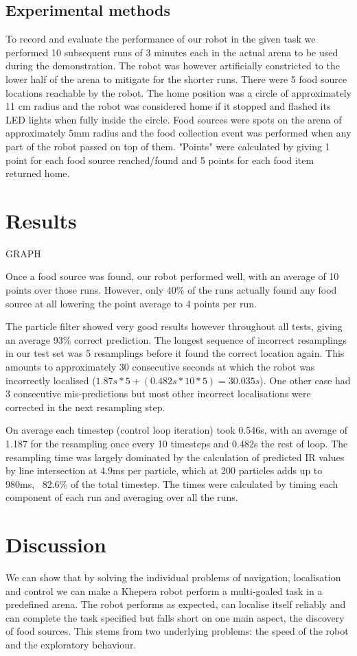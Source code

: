 \documentclass[paper=a4, fontsize=12pt]{scrartcl}	%
\numberwithin{equation}{section}		%
\numberwithin{figure}{section}			%
\numberwithin{table}{section}				%
\begin{document}
\subsection{Experimental methods}
To record and evaluate the performance of our robot in the given task we performed 10 subsequent runs of 3 minutes each in the actual arena to be used during the demonstration. The robot was however artificially constricted to the lower half of the arena to mitigate for the shorter runs. There were 5 food source locations reachable by the robot. The home position was a circle of approximately 11 cm radius and the robot was considered home if it stopped and flashed its LED lights when fully inside the circle. Food sources were spots on the arena of approximately 5mm radius and the food collection event was performed when any part of the robot passed on top of them. "Points" were calculated by giving 1 point for each food source reached/found and 5 points for each food item returned home.

\section{Results}
GRAPH

Once a food source was found, our robot performed well, with an average of 10 points over those runs. However, only 40\% of the runs actually found any food source at all lowering the point average to 4 points per run.

The particle filter showed very good results however throughout all tests, giving an average 93\% correct prediction. The longest sequence of incorrect resamplings in our test set was 5 resamplings before it found the correct location again. This amounts to approximately 30 consecutive seconds at which the robot was incorrectly localised (\(1.87s * 5 + (0.482s * 10 * 5) = 30.035s\)). One other case had 3 consecutive mis-predictions but most other incorrect localisations were corrected in the next resampling step.

On average each timestep (control loop iteration) took 0.546s, with an average of 1.187 for the resampling once every 10 timesteps and 0.482s the rest of loop. The resampling time was largely dominated by the calculation of predicted IR values by line intersection at 4.9ms per particle, which at 200 particles adds up to 980ms, ~82.6\% of the total timestep. The times were calculated by timing each component of each run and averaging over all the runs.

\section{Discussion}
We can show that by solving the individual problems of navigation, localisation and control we can make a Khepera robot perform a multi-goaled task in a predefined arena. The robot performs as expected, can localise itself reliably and can complete the task specified but falls short on one main aspect, the discovery of food sources. This stems from two underlying problems: the speed of the robot and the exploratory behaviour.
\end{document}
